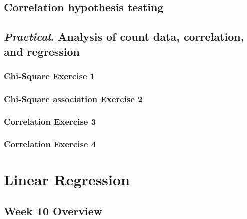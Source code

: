 \documentclass[
]{scrbook}
\begin{document}
\hypertarget{correlation-hypothesis-testing}{%
\chapter{Correlation hypothesis testing}\label{correlation-hypothesis-testing}}

\hypertarget{practical.-analysis-of-count-data-correlation-and-regression}{%
\chapter{\texorpdfstring{\emph{Practical}. Analysis of count data, correlation, and regression}{Practical. Analysis of count data, correlation, and regression}}\label{practical.-analysis-of-count-data-correlation-and-regression}}

\hypertarget{chi-square-exercise-1}{%
\section{Chi-Square Exercise 1}\label{chi-square-exercise-1}}

\hypertarget{chi-square-association-exercise-2}{%
\section{Chi-Square association Exercise 2}\label{chi-square-association-exercise-2}}

\hypertarget{correlation-exercise-3}{%
\section{Correlation Exercise 3}\label{correlation-exercise-3}}

\hypertarget{correlation-exercise-4}{%
\section{Correlation Exercise 4}\label{correlation-exercise-4}}

\hypertarget{part-linear-regression}{%
\part{Linear Regression}\label{part-linear-regression}}

\hypertarget{Week10}{%
\chapter*{Week 10 Overview}\label{Week10}}
\end{document}
